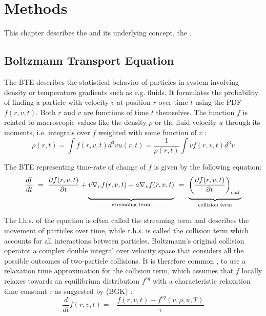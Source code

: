 \section{Methods}

This chapter describes the  and its underlying concept, the .

\subsection{Boltzmann Transport Equation}

The \gls{BTE} describes the statistical behavior of particles in system involving density or temperature gradients such as e.g. fluids. It formulates the probability of finding a particle with velocity $v$ at position $r$ over time $t$ using the \gls{PDF} $f(r,v,t)$. Both $r$ and $v$ are functions of time $t$ themselves. The function $f$ is related to macroscopic values like the density $\rho$ or the fluid velocity $u$ through its moments, i.e. integrals over $f$ weighted with some function of $v$ \cite{timm2016lattice}:
\begin{subequations}
    \begin{equation}
        \rho(r,t) = \int f(r,v,t) d^3v
        \label{eq:bte:moment:density}
    \end{equation}
    \begin{equation}
        u(r,t) = \frac{1}{\rho(r,t)} \int v f(r,v,t) d^3v
        \label{eq:bte:moment:velocity}
    \end{equation}
\end{subequations}

The \gls{BTE} representing time-rate of change of $f$ is given by the following equation:
\begin{equation}
    \frac{df}{dt} ~=~ \frac{\partial f(r,v,t)}{\partial t} + \underbrace{v \nabla_r f(r,v,t) + a \nabla_v f(r,v,t)\vphantom{\frac{1}{\frac{2}{\frac{3}{4}}}}}_{\text{streaming term}} ~=~ \underbrace{\left(\frac{\partial f(r,v,t)}{\partial t}\right)_{coll}\vphantom{\frac{1}{\frac{2}{\frac{3}{4}}}}}_{\text{collision term}}
    \label{eq:bte}
\end{equation}

The l.h.s. of the equation is often called the streaming term and describes the movement of particles over time, while r.h.s. is called the collision term which accounts for all interactions between particles. Boltzmann's original collision operator a complex double integral over velocity space that considers all the possible
outcomes of two-particle collisions. It is therefore common \cite{timm2016lattice}, to use a relaxation time approximation for the collision term, which assumes that $f$ locally relaxes towards an equilibrium distribution $f^{eq}$ with a characteristic relaxation time constant $\tau$ as suggested by \citeauthor{BGK} (BGK) \cite{BGK}:
\begin{equation}
    \frac{d}{dt} f(r,v,t) = - \frac{f(r,v,t) - f^{eq}\left(v,\rho,u,T\right)}{\tau}
    \label{eq:bgk-collision}
\end{equation}

